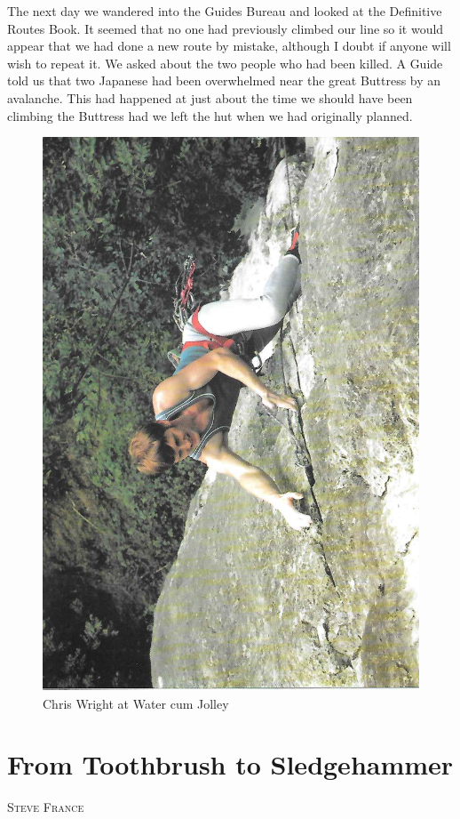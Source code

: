 \documentclass[a5paper,openany,font 10pt]{scrbook}
\makeatletter
\newcommand{\chapterauthor}[1]{%
{\parindent0pt\vspace*{-5pt}%
\linespread{1.1}\large\scshape#1%
\par\nobreak\vspace*{35pt}}
\@afterheading%
}
\makeatother
\begin{document}
The next day we wandered into the Guides Bureau and looked
at the Definitive Routes Book. It seemed that no one had
previously climbed our line so it would appear that we had done a
new route by mistake, although I doubt if anyone will wish to
repeat it. We asked about the two people who had been killed. A
Guide told us that two Japanese had been overwhelmed near the
great Buttress by an avalanche. This had happened at just about
the time we should have been climbing the Buttress had we left
the hut when we had originally planned.
\begin{figure}[htb]
\centering
\includegraphics[width=.9\linewidth]{./images/Chris_Wright_at_Water_cum_Jolley.jpg}
\caption{\label{fig:orga9b65b6}
Chris Wright at Water cum Jolley}
\end{figure}

\chapter{From Toothbrush to Sledgehammer}
\label{sec:org5afd1f5}
\chapterauthor{Steve France}
\end{document}
